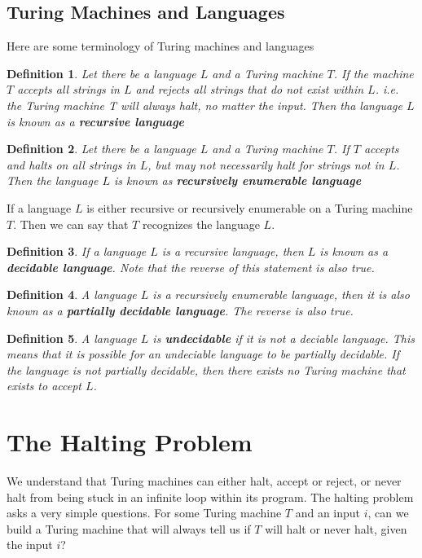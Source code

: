 \documentclass[12pt, letterpaper]{article}
\newtheorem*{defn}{Definition}
\begin{document}
\subsection{Turing Machines and Languages}
Here are some terminology of Turing machines and languages \cite{kozen}
\begin{defn}
Let there be a language $L$ and a Turing machine $T$. If the machine $T$ accepts all strings in $L$ and rejects all strings that do not exist within $L$. i.e. the Turing machine T will always halt, no matter the input. Then tha language $L$ is known as a \textbf{recursive language}
\end{defn}

\begin{defn}
Let there be a language $L$ and a Turing machine $T$. If $T$ accepts and halts on all strings in $L$, but may not necessarily halt for strings not in $L$. Then the language $L$ is known as \textbf{recursively enumerable language}
\end{defn}

If a language $L$ is either recursive or recursively enumerable on a Turing machine $T$. Then we can say that $T$ recognizes the language $L$.

\begin{defn}
If a language $L$ is a recursive language, then $L$ is known as a \textbf{decidable language}. Note that the reverse of this statement is also true.
\end{defn}

\begin{defn}
A language $L$ is a recursively enumerable language, then it is also known as a \textbf{partially decidable language}. The reverse is also true.
\end{defn}

\begin{defn}
A language $L$ is \textbf{undecidable} if it is not a deciable language. This means that it is possible for an undeciable language to be partially decidable. If the language is not partially decidable, then there exists no Turing machine that exists to accept $L$.
\end{defn}


\section{The Halting Problem}
We understand that Turing machines can either halt, accept or reject, or never halt from being stuck in an infinite loop within its program. The halting problem asks a very simple questions. For some Turing machine $T$ and an input $i$, can we build a Turing machine that will always tell us if $T$ will halt or never halt, given the input $i$?\cite{salvador}\\  
\end{document}
